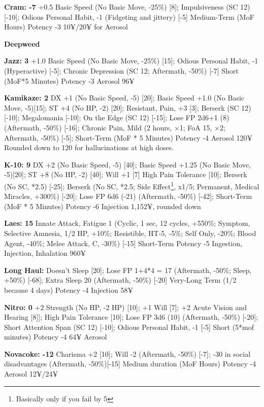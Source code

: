 \begin{multicols*}{2}
	\textbf{Cram: -7}
	+0.5 Basic Speed (No Basic Move, -25\%) [8]; Impulsiveness (SC 12) [-10]; Odious Personal Habit, -1 (Fidgeting and jittery) [-5]
	Medium-Term (MoF Hours)
	Potency -3
	10¥/20¥ for Aerosol
	
	\textbf{Deepweed}
	
	
	
	\textbf{Jazz: 3}
	+1.0 Basic Speed (No Basic Move, -25\%) [15]; Odious Personal Habit, -1 (Hyperactive) [-5]; Chronic Depression (SC 12; Aftermath, -50\%) [-7]
	Short (MoF*5 Minutes)
	Potency -3
	Aerosol
	96¥
	
	\textbf{Kamikaze: 2}
	DX +1 (No Basic Speed, -5) [20];  Basic Speed +1.0 (No Basic Move, -5)[15]; ST +4 (No HP, -2) [20]; Resistant, Pain, +3 [3]; Berserk (SC 12) [-10]; Megalomania [-10]; On the Edge (SC 12) [-15]; Lose FP 2d6+1 (8) (Aftermath, -50\%) [-16]; Chronic Pain, Mild (2 hours, $\times$1; FoA 15, $\times$2; Aftermath, -50\%) [-5];
	Short-Term (MoF * 5 Minutes)
	Potency -4
	Aerosol
	120¥
	Rounded down to 120 for hallucinations at high doses.
	
	\textbf{K-10: 9}
	DX +2 (No Basic Speed, -5) [40]; Basic Speed +1.25 (No Basic Move, -5)[20]; ST +8 (No HP, -2) [40]; Will +1 [7] High Pain Tolerance [10]; Berserk (No SC, *2.5) [-25]; Berserk (No SC, *2.5; Side Effect\footnote{Basically only if you fail by 5}, x1/5; Permanent, Medical Miracles, +300\%) [-20]; Lose FP 6d6 (-21) (Aftermath, -50\%) [-42];
	Short-Term (MoF * 5 Minutes)
	Potency -6
	Injection
	1,152¥, rounded down
	
	\textbf{Laes: 15}
	Innate Attack, Fatigue 1 (Cyclic, 1 sec, 12 cycles, +550\%; Symptom, Selective Amnesia, 1/2 HP, +10\%; Resistible, HT-5, -5\%; Self Only, -20\%; Blood Agent, -40\%; Melee Attack, C, -30\%) [-15]
	Short-Term
	Potency -5
	Ingestion, Injection, Inhalation
	960¥
	
	\textbf{Long Haul: }
	Doesn't Sleep [20]; Lose FP 1+4*4 = 17 (Aftermath, -50\%; Sleep, +50\%) [-68]; Extra Sleep 20 (Aftermath, -50\%) [-20]
	Very-Long Term (1/2 because 4 days)
	Potency -4
	Injection
	58¥
	
	\textbf{Nitro: 0}
	+2 Strength (No HP, -2 HP) [10]; +1 Will [7]; +2 Acute Vision and Hearing [8]]; High Pain Tolerance [10]; Lose FP 3d6 (10) (Aftermath, -50\%) [-20]; Short Attention Span (SC 12) [-10]; Odious Personal Habit, -1 [-5]
	Short (5*mof minutes)
	Potency -4
	64¥
	Aerosol
	
	\textbf{Novacoke: -12}
	Charisma +2 [10]; Will -2 (Aftermath, -50\%) [-7]; -30 in social disadvantages (Aftermath, -50\%)[-15]
	Medium duration (MoF Hours)
	Potency -4
	Aerosol
	12¥/24¥
	

\end{multicols*}
